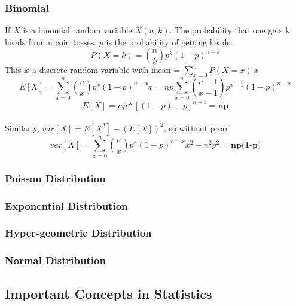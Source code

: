 \documentclass[12pt]{article}
\begin{document}
\subsubsection{Binomial}
If $X$ is a binomial random variable $X(n,k)$. The probability that one gets k heads from n coin tosses. $p$ is the probability of getting heads: 
\begin{equation*}
P(X = k) = \binom{n}{k} p^{k}(1-p)^{n-k}
\end{equation*}
This is a discrete random variable with mean = $\sum\limits_{x =0}^{n} P(X = x)\:x\: $
\begin{equation*}
    E[X] = \sum\limits_{x = 0}^{n} \binom{n}{x} p^{x}(1-p)^{n-x} x = np\sum\limits_{x = 0}^{n} \binom{n-1}{x-1} p^{x-1}(1-p)^{n-x} 
\end{equation*}
\begin{equation*}
    E[X] = np*[(1-p) + p]^{n-1} = \textbf{np}
\end{equation*}\\
Similarly, $var[X] = E[X^{2}] - (E[X])^{2}$, so without proof
\begin{equation*}
    var[X] = \sum\limits_{x = 0}^{n} \binom{n}{x} p^{x}(1-p)^{n-x} x^{2} - n^{2}p^{2} = \textbf{np(1-p)} 
\end{equation*}
\subsubsection{Poisson Distribution}
\subsubsection{Exponential Distribution}
\subsubsection{Hyper-geometric Distribution}
\subsubsection{Normal Distribution}

\subsection{Important Concepts in Statistics}
\end{document}
